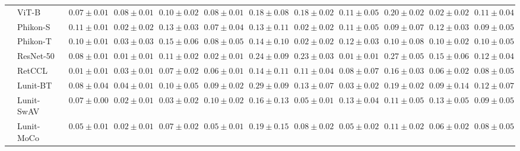 \begin{tabular}{ll|cccc|c|cccc|c}
 & ViT-B~\cite{kolesnikov2021image} & $0.07 \pm 0.01$ & $0.08 \pm 0.01$ & $0.10 \pm 0.02$ & $0.08 \pm 0.01$ & $0.18 \pm 0.08$ & $0.18 \pm 0.02$ & $0.11 \pm 0.05$ & $0.20 \pm 0.02$ & $0.02 \pm 0.02$ & $0.11 \pm 0.04$ \\
 & Phikon-S~\cite{filiot2023scaling} & $0.11 \pm 0.01$ & $0.02 \pm 0.02$ & $0.13 \pm 0.03$ & $0.07 \pm 0.04$ & $0.13 \pm 0.11$ & $0.02 \pm 0.02$ & $0.11 \pm 0.05$ & $0.09 \pm 0.07$ & $0.12 \pm 0.03$ & $0.09 \pm 0.05$ \\
 & Phikon-T~\cite{filiot2023scaling} & $0.10 \pm 0.01$ & $0.03 \pm 0.03$ & $0.15 \pm 0.06$ & $0.08 \pm 0.05$ & $0.14 \pm 0.10$ & $0.02 \pm 0.02$ & $0.12 \pm 0.03$ & $0.10 \pm 0.08$ & $0.10 \pm 0.02$ & $0.10 \pm 0.05$ \\
 & ResNet-50~\cite{he2015deep} & $0.08 \pm 0.01$ & $\mathbf{0.01 \pm 0.01}$ & $0.11 \pm 0.02$ & $0.02 \pm 0.01$ & $0.24 \pm 0.09$ & $0.23 \pm 0.03$ & $\mathbf{0.01 \pm 0.01}$ & $0.27 \pm 0.05$ & $0.15 \pm 0.06$ & $0.12 \pm 0.04$ \\
 & RetCCL~\cite{wang2023retccl} & $0.01 \pm 0.01$ & $0.03 \pm 0.01$ & $0.07 \pm 0.02$ & $0.06 \pm 0.01$ & $0.14 \pm 0.11$ & $0.11 \pm 0.04$ & $0.08 \pm 0.07$ & $0.16 \pm 0.03$ & $0.06 \pm 0.02$ & $0.08 \pm 0.05$ \\
 & Lunit-BT~\cite{kang2023benchmarking} & $0.08 \pm 0.04$ & $0.04 \pm 0.01$ & $0.10 \pm 0.05$ & $0.09 \pm 0.02$ & $0.29 \pm 0.09$ & $0.13 \pm 0.07$ & $0.03 \pm 0.02$ & $0.19 \pm 0.02$ & $0.09 \pm 0.14$ & $0.12 \pm 0.07$ \\
 & Lunit-SwAV~\cite{kang2023benchmarking} & $0.07 \pm 0.00$ & $0.02 \pm 0.01$ & $0.03 \pm 0.02$ & $0.10 \pm 0.02$ & $0.16 \pm 0.13$ & $0.05 \pm 0.01$ & $0.13 \pm 0.04$ & $0.11 \pm 0.05$ & $0.13 \pm 0.05$ & $0.09 \pm 0.05$ \\
 & Lunit-MoCo~\cite{kang2023benchmarking} & $0.05 \pm 0.01$ & $0.02 \pm 0.01$ & $0.07 \pm 0.02$ & $0.05 \pm 0.01$ & $0.19 \pm 0.15$ & $0.08 \pm 0.02$ & $0.05 \pm 0.02$ & $0.11 \pm 0.02$ & $0.06 \pm 0.02$ & $0.08 \pm 0.05$ \\
\cline{1-12}
\bottomrule
\end{tabular}

